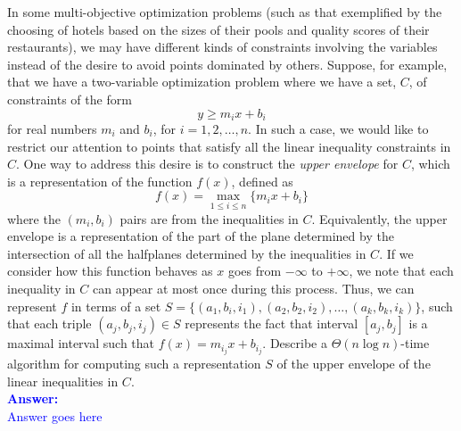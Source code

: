 \item{}
In some multi-objective optimization problems (such as that exemplified by the
choosing of hotels based on the sizes of their pools and quality scores of their
restaurants), we may have different kinds of constraints involving the variables
instead of the desire to avoid points dominated by others. Suppose, for example,
that we have a two-variable optimization problem where we have a set, $C$, of
constraints of the form $$y\ge m_ix+b_i$$ for real numbers $m_i$ and $b_i$, for
$i=1,2,\ldots,n$. In such a case, we would like to restrict our attention to
points that satisfy all the linear inequality constraints in $C$. One way to
address this desire is to construct the \emph{upper envelope} for $C$, which is
a representation of the function $f(x)$, defined as $$f(x)=\max_{1\le i\le n}
\lbrace m_ix+b_i\rbrace$$ where the $(m_i,b_i)$ pairs are from the inequalities
in $C$. Equivalently, the upper envelope is a representation of the part of the
plane determined by the intersection of all the halfplanes determined by the
inequalities in $C$. If we consider how this function behaves as $x$ goes from
$-\infty$ to $+\infty$, we note that each inequality in $C$ can appear at most
once during this process. Thus, we can represent $f$ in terms of a set $S=
\lbrace(a_1,b_i,i_1),(a_2,b_2,i_2),\ldots,(a_k,b_k,i_k)\rbrace$, such that each
triple $(a_j,b_j,i_j)\in S$ represents the fact that interval $[a_j,b_j]$ is a
maximal interval such that $f(x)=m_{i_j}x+b_{i_j}$. Describe a $\Theta(n\log
n)$-time algorithm for computing such a representation $S$ of the upper envelope
of the linear inequalities in $C$.\\[12pt]
\ifanswers
\textcolor{blue}{
\textbf{Answer:}\\[6pt]
Answer goes here
}
\newpage
\fi
